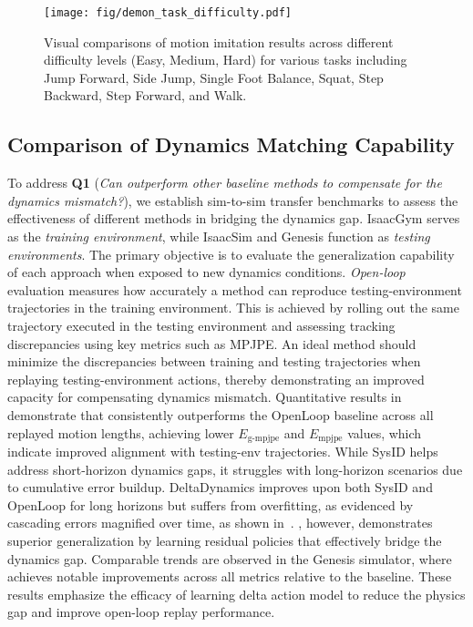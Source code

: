 



\begin{figure*}[t]
    \centering
    \texttt{[image: fig/demon\_task\_difficulty.pdf]}
    \vspace{-6mm}
    \caption{Visual comparisons of motion imitation results across different difficulty levels (Easy, Medium, Hard) for various tasks including Jump Forward, Side Jump, Single Foot Balance, Squat, Step Backward, Step Forward, and Walk.}
    \vspace{-2mm}
    \label{fig:demo_task_difficulty}
\end{figure*}


\subsection{Comparison of Dynamics Matching Capability}
\label{sec:sim-open-loop}

To address \textbf{Q1} (\textit{Can \method outperform other baseline methods to compensate for the dynamics mismatch?}), we establish sim-to-sim transfer benchmarks to assess the effectiveness of different methods in bridging the dynamics gap. IsaacGym serves as the \textit{training environment}, while IsaacSim and Genesis function as \textit{testing environments}. The primary objective is to evaluate the generalization capability of each approach when exposed to new dynamics conditions.
\textit{Open-loop} evaluation measures how accurately a method can reproduce testing-environment trajectories in the training environment. This is achieved by rolling out the same trajectory executed in the testing environment and assessing tracking discrepancies using key metrics such as MPJPE. An ideal method should minimize the discrepancies between training and testing trajectories when replaying testing-environment actions, thereby demonstrating an improved capacity for compensating dynamics mismatch. Quantitative results in~ demonstrate that \method consistently outperforms the OpenLoop baseline across all replayed motion lengths, achieving lower $E_\text{g-mpjpe}$ and $E_\text{mpjpe}$ values, which indicate improved alignment with testing-env trajectories. 
While SysID helps address short-horizon dynamics gaps, it struggles with long-horizon scenarios due to cumulative error buildup. DeltaDynamics improves upon both SysID and OpenLoop for long horizons but suffers from overfitting, as evidenced by cascading errors magnified over time, as shown in~. 
\method, however, demonstrates superior generalization by learning residual policies that effectively bridge the dynamics gap. Comparable trends are observed in the Genesis simulator, where \method achieves notable improvements across all metrics relative to the baseline. These results emphasize the efficacy of learning delta action model to reduce the physics gap and improve open-loop replay performance.







